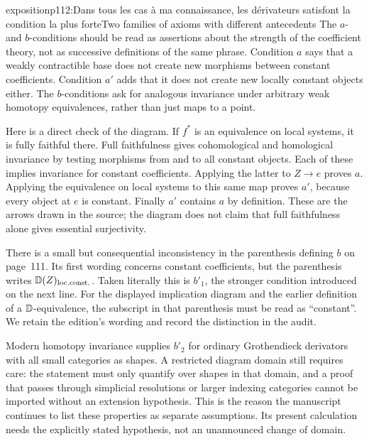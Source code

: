 \begin{dcomment}{exposition}{p112:Dans tous les cas à ma connaissance, les dérivateurs satisfont la condition la plus forte}{Two families of axioms with different antecedents}
The $a$- and $b$-conditions should be read as assertions about the strength of the coefficient theory, not as successive definitions of the same phrase. Condition $a$ says that a weakly contractible base does not create new morphisms between constant coefficients. Condition $a'$ adds that it does not create new locally constant objects either. The $b$-conditions ask for analogous invariance under arbitrary weak homotopy equivalences, rather than just maps to a point.

Here is a direct check of the diagram. If $f^*$ is an equivalence on local systems, it is fully faithful there. Full faithfulness gives cohomological and homological invariance by testing morphisms from and to all constant objects. Each of these implies invariance for constant coefficients. Applying the latter to $Z\to e$ proves $a$. Applying the equivalence on local systems to this same map proves $a'$, because every object at $e$ is constant. Finally $a'$ contains $a$ by definition. These are the arrows drawn in the source; the diagram does not claim that full faithfulness alone gives essential surjectivity.

There is a small but consequential inconsistency in the parenthesis defining $b$ on page~111. Its first wording concerns constant coefficients, but the parenthesis writes $\mathbb{D}(Z)_{\mathrm{loc.const.}}$. Taken literally this is $b'_1$, the stronger condition introduced on the next line. For the displayed implication diagram and the earlier definition of a $\mathbb{D}$-equivalence, the subscript in that parenthesis must be read as ``constant''. We retain the edition's wording and record the distinction in the audit.

Modern homotopy invariance supplies $b'_2$ for ordinary Grothendieck derivators with all small categories as shapes. A restricted diagram domain still requires care: the statement must only quantify over shapes in that domain, and a proof that passes through simplicial resolutions or larger indexing categories cannot be imported without an extension hypothesis. This is the reason the manuscript continues to list these properties as separate assumptions. Its present calculation needs the explicitly stated hypothesis, not an unannounced change of domain.
\end{dcomment}


